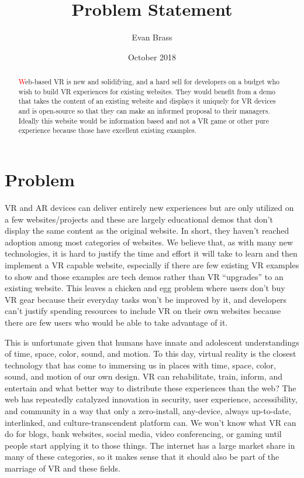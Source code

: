 \documentclass[draftclsnofoot,onecolumn]{IEEEtran}
\title{Problem Statement}
\author{Evan Brass}
\date{October 2018}
\begin{document}
\begin{abstract}
\par \textcolor{red} Web-based VR is new and solidifying, and a hard sell for developers on a budget who wish to build VR experiences for existing websites.  They would benefit from a demo that takes the content of an existing website and displays it uniquely for VR devices and is open-source so that they can make an informed proposal to their managers.  Ideally this website would be information based and not a VR game or other pure experience because those have excellent existing examples.
\end{abstract}

\maketitle

\section{Problem}
\par VR and AR devices can deliver entirely new experiences but are only utilized on a few websites/projects and these are largely educational demos that don’t display the same content as the original website.  In short, they haven’t reached adoption among most categories of websites.  We believe that, as with many new technologies, it is hard to justify the time and effort it will take to learn and then implement a VR capable website, especially if there are few existing VR examples to show and those examples are tech demos rather than VR “upgrades” to an existing website.  This leaves a chicken and egg problem where users don’t buy VR gear because their everyday tasks won’t be improved by it, and developers can’t justify spending resources to include VR on their own websites because there are few users who would be able to take advantage of it.

\par This is unfortunate given that humans have innate and adolescent understandings of time, space, color, sound, and motion.  To this day, virtual reality is the closest technology that has come to immersing us in places with time, space, color, sound, and motion of our own design.  VR can rehabilitate, train, inform, and entertain and what better way to distribute these experiences than the web?  The web has repeatedly catalyzed innovation in security, user experience, accessibility, and community in a way that only a zero-install, any-device, always up-to-date, interlinked, and culture-transcendent platform can.  We won’t know what VR can do for blogs, bank websites, social media, video conferencing, or gaming until people start applying it to those things.  The internet has a large market share in many of these categories, so it makes sense that it should also be part of the marriage of VR and these fields.
\end{document}
